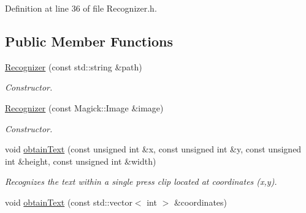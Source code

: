 Definition at line 36 of file Recognizer.h.\subsection*{Public Member Functions}
\begin{CompactItemize}
\item 
\hypertarget{class_recognizer_50ffc181208bb07ae651aba6249ee7e4}{
\hyperlink{class_recognizer_50ffc181208bb07ae651aba6249ee7e4}{Recognizer} (const std::string \&path)}
\label{class_recognizer_50ffc181208bb07ae651aba6249ee7e4}

\begin{CompactList}\small\item\em Constructor. \item\end{CompactList}\item 
\hypertarget{class_recognizer_ff6b7a9d0550c846f9476796e6bff711}{
\hyperlink{class_recognizer_ff6b7a9d0550c846f9476796e6bff711}{Recognizer} (const Magick::Image \&image)}
\label{class_recognizer_ff6b7a9d0550c846f9476796e6bff711}

\begin{CompactList}\small\item\em Constructor. \item\end{CompactList}\item 
\hypertarget{class_recognizer_bbe86867c7c9f41c149001177124f048}{
void \hyperlink{class_recognizer_bbe86867c7c9f41c149001177124f048}{obtainText} (const unsigned int \&x, const unsigned int \&y, const unsigned int \&height, const unsigned int \&width)}
\label{class_recognizer_bbe86867c7c9f41c149001177124f048}

\begin{CompactList}\small\item\em Recognizes the text within a single press clip located at coordinates (x,y). \item\end{CompactList}\item 
\hypertarget{class_recognizer_ae7cd5077266fe72d0d00668b046ddd6}{
void \hyperlink{class_recognizer_ae7cd5077266fe72d0d00668b046ddd6}{obtainText} (const std::vector$<$ int $>$ \&coordinates)}
\label{class_recognizer_ae7cd5077266fe72d0d00668b046ddd6}


\end{CompactItemize}
